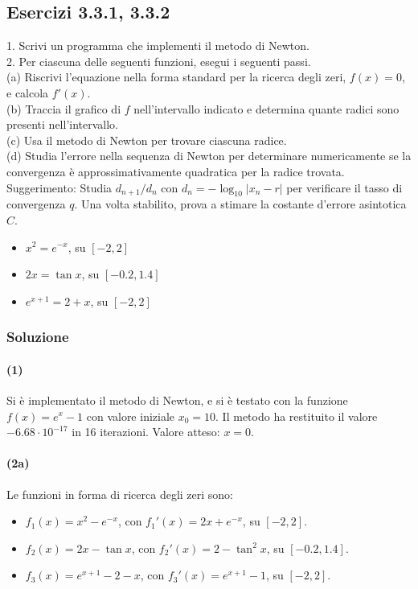 \documentclass[letterpaper, 12pt]{article}
\begin{document}
\subsection{Esercizi 3.3.1, 3.3.2}
1. Scrivi un programma che implementi il metodo di Newton.\\
2. Per ciascuna delle seguenti funzioni, esegui i seguenti passi.\\  
(a) Riscrivi l'equazione nella forma standard per la ricerca degli zeri, $f(x) = 0$, e calcola $f'(x)$. \\
(b) Traccia il grafico di $f$ nell'intervallo indicato e determina quante radici sono presenti nell'intervallo. \\
(c) Usa il metodo di Newton per trovare ciascuna radice. \\
(d) Studia l'errore nella sequenza di Newton per determinare numericamente se la convergenza è approssimativamente quadratica per la radice trovata. \\
Suggerimento: Studia $d_{n+1}/d_{n}$ con $d_n=-\log_{10}|x_n-r|$ per verificare il tasso di convergenza $q$. Una volta stabilito, prova a stimare la costante d'errore asintotica $C$. \\
\begin{itemize}
    \item $x^2=e^{-x}$, su $[-2,2]$ \\
    \item $2x = \tan x$, su $[-0.2,1.4]$ \\
    \item $e^{x+1}=2+x$, su $[-2,2]$ \\
\end{itemize}
    
\subsubsection{Soluzione}
\paragraph{(1) } Si è implementato il metodo di Newton, e si è testato con la funzione $f(x)=e^x - 1$ con valore
iniziale $x_0 = 10$. Il metodo ha restituito il valore $-6.68 \cdot 10^{-17}$ in 16 iterazioni. 
Valore atteso: $x = 0$. \\

\paragraph{(2a) } Le funzioni in forma di ricerca degli zeri sono:
\begin{itemize}
    \item $f_1(x) = x^2 - e^{-x}$, con $f_1'(x) = 2x + e^{-x}$, su $[-2,2]$.
    \item $f_2(x) = 2x - \tan x$, con $f_2'(x) = 2 - \tan^2 x$, su $[-0.2,1.4]$.
    \item $f_3(x) = e^{x+1} - 2 - x$, con $f_3'(x) = e^{x+1} - 1$, su $[-2,2]$.
\end{itemize}
\end{document}
